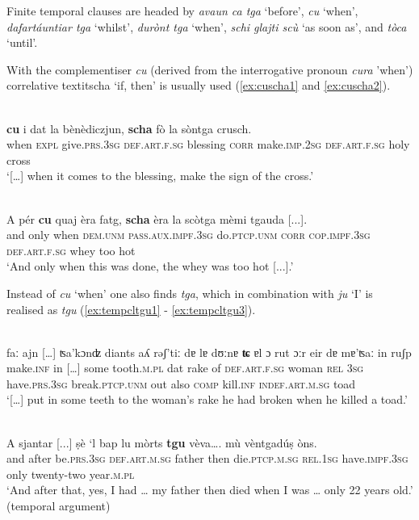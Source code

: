 Finite temporal clauses are headed by \textit{avaun ca tga} `before', \textit{cu} `when', \textit{dafartáuntiar tga} `whilst', \textit{durònt tga} `when', \textit{schi glajti scù} `as soon as', and \textit{tòca} `until'.

With the complementiser \textit{cu} (derived from the interrogative pronoun \textit{cura} 'when') correlative textit{scha} `if, then' is usually used (\ref{ex:cuscha1} and \ref{ex:cuscha2}).

\ea
\label{ex:cuscha1}
\\
\gll  […] \textbf{cu} i dat la bènèdiczjun, \textbf{scha} fò la sòntga crusch.\\
    […] when \textsc{expl} give.\textsc{prs.3sg} \textsc{def.art.f.sg} blessing \textsc{corr} make.\textsc{imp.2sg} \textsc{def.art.f.sg} holy cross\\
\glt `[…] when it comes to the blessing, make the sign of the cross.'
\z

\ea
\label{ex:cuscha2}
\\
	\gll  A pér \textbf{cu} quaj èra fatg, \textbf{scha} èra la scòtga mèmi tgauda [...].  \\
and only when \textsc{dem.unm} \textsc{pass.aux.impf.3sg} do.\textsc{ptcp.unm} \textsc{corr} \textsc{cop.impf.3sg} \textsc{def.art.f.sg} whey too hot\\
\glt `And only when this was done, the whey was too hot [...].'
\z

Instead of \textit{cu} `when' one also finds \textit{tga}, which in combination with \textit{ju} `I' is realised as \textit{tgu} (\ref{ex:tempcltgu1} - \ref{ex:tempcltgu3}).

\ea
\label{ex:tempcltgu1}
\\
\gll    […] faː ajn […] ʦa’kɔnʣ diants aʎ rǝʃ’tiː dɐ lɐ dʊːnɐ \textbf{ʨ} ɐl ɔ rut ɔːr eir dɐ mɐ’ʦaː in ruʃp\\
[…] make.\textsc{inf} in […] some tooth.\textsc{m.pl} {dat} rake of \textsc{def.art.f.sg} woman \textsc{rel} \textsc{3sg} have.\textsc{prs.3sg} break.\textsc{ptcp.unm} out also \textsc{comp} kill.\textsc{inf} \textsc{indef.art.m.sg} toad\\
\glt `[…] put in some teeth to the woman’s rake he had broken when he killed a toad.'
\z

\ea
\label{ex:tempcltgu2}
\\
\gll    A sjantar [...] ṣè `l bap lu mòrts \textbf{tgu} vèva…. mù vèntgadúṣ òns.\\
and after {} be.\textsc{prs.3sg} \textsc{def.art.m.sg} father then die.\textsc{ptcp.m.sg} \textsc{rel.1sg} have.\textsc{impf.3sg} only twenty-two year.\textsc{m.pl}\\
\glt `And after that, yes, I had … my father then died when I was … only 22 years old.' (temporal argument)
\z

